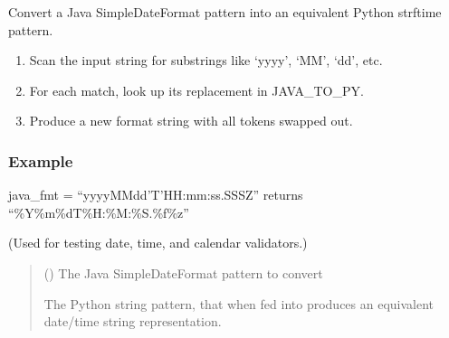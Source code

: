 \documentclass[letterpaper,10pt,english]{sphinxmanual}
\begin{document}

\begin{fulllineitems}
\label{\detokenize{apache_commons_validator_python.util:apache_commons_validator_python.util.datetime_helpers.ldml_to_strptime_format}}
\pysigstartsignatures
{}
\pysigstopsignatures
\sphinxAtStartPar
Convert a Java SimpleDateFormat pattern into an equivalent Python strftime
pattern.
\begin{description}
\begin{enumerate}
%
\item {} 
\sphinxAtStartPar
Scan the input string for substrings like ‘yyyy’, ‘MM’, ‘dd’, etc.

\item {} 
\sphinxAtStartPar
For each match, look up its replacement in JAVA\_TO\_PY.

\item {} 
\sphinxAtStartPar
Produce a new format string with all tokens swapped out.

\end{enumerate}

\end{description}
\subsubsection*{Example}

\sphinxAtStartPar
java\_fmt = “yyyy\sphinxhyphen{}MM\sphinxhyphen{}dd’T’HH:mm:ss.SSSZ”
returns “\%Y\sphinxhyphen{}\%m\sphinxhyphen{}\%dT\%H:\%M:\%S.\%f\%z”

\sphinxAtStartPar
(Used for testing date, time, and calendar validators.)
\begin{quote}\begin{description}
\sphinxAtStartPar
{} () \textendash{} The Java SimpleDateFormat pattern to convert

\sphinxAtStartPar
The Python string pattern, that when fed into  produces
an equivalent date/time string representation.

\end{description}\end{quote}

\end{fulllineitems}
\end{document}
